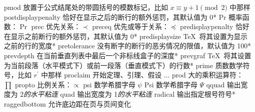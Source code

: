\capcs pmod {放置于公式结尾处的带圆括号的模数标记，比如 $x \equiv y+1 \pmod 2$ 中那样}{}{}
\capcs postdisplaypenalty {恰好在显示之后的断行的额外惩罚，其默认值为 0}*{}
\capcs Pr {概率函数：$\Pr$}{}{}
\capcs prec {优先关系：$\prec$}{}{}
\capcs preceq {优先或等于关系：$\preceq$}{}{}
\capcs predisplaypenalty {恰好在显示之前断行的额外惩罚，其默认值为 0}*{}
\capcs predisplaysize {\TeX\ 将其设置为显示之前的行的宽度}*{}
\capcs pretolerance {没有断字的断行的恶劣情况的限值，默认值为 100}*{}
\capcs prevdepth {在当前垂直列表中最后一个非标线盒子的深度}*{}
\capcs prevgraf {\TeX\ 将其设置为当前段落（水平模式下）或前一段落（垂直模式下）的行数}*{}
\capcs prime {质数数学符号，比如 $r^\prime$ 中那样}{}{}
\capcs proclaim {开始定理、引理、假设 $\ldots$}{}{\@proclaim}
\capcs prod {大的乘积运算符：$\prod$}{}{}
\capcs propto {比例关系：$\propto$}{}{}
\capcs psi {数学希腊字母 $\psi$}{}{}
\capcs Psi {数学希腊字母 $\Psi$}{}{}
\capcs qquad {输出宽度为 2\em 的水平粘连}{}{}
\capcs quad {输出宽度为 1\em 的水平粘连}{}{}
\capcs radical {输出指定根号符号}*{}
\capcs raggedbottom {允许底边距在页与页间变化}{}{}
